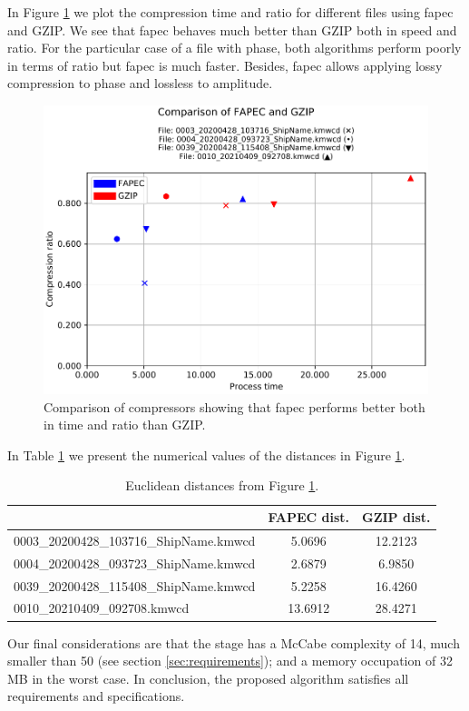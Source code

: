 In Figure \ref{fig:kmall_compare} we plot the compression time and ratio for different files using \acrshort{fapec} and GZIP. We see that \acrshort{fapec} behaves much better than GZIP both in speed and ratio. For the particular case of a file with phase, both algorithms perform poorly in terms of ratio but \acrshort{fapec} is much faster. Besides, \acrshort{fapec} allows applying lossy compression to phase and lossless to amplitude.

\begin{figure}[h!]
	\begin{center}
		\includegraphics[scale=0.69]{images/2021-05-31T23:59:08.498586-results_kmall.csv_comparison.pdf}
	\end{center}
	\caption{Comparison of compressors showing that \acrshort{fapec} performs better both in time and ratio than GZIP.}
	\label{fig:kmall_compare}
\end{figure}

In Table \ref{tab:kmall_compare} we present the numerical values of the distances in Figure \ref{fig:kmall_compare}.

\begin{table}[h!]
\normalsize
\centering
\begin{tabular}{|l|c|c|}
	\hline
	\rowcolor[HTML]{d6cefc} 
	\multicolumn{1}{|c|}{\cellcolor[HTML]{d6cefc}Filename}         & FAPEC dist. & GZIP dist. \\ \hline
	\cellcolor[HTML]{FFFFFF}0003\_20200428\_103716\_ShipName.kmwcd & 5.0696      & 12.2123    \\ \hline
	\cellcolor[HTML]{FFFFFF}0004\_20200428\_093723\_ShipName.kmwcd & 2.6879      & 6.9850     \\ \hline
	\cellcolor[HTML]{FFFFFF}0039\_20200428\_115408\_ShipName.kmwcd & 5.2258      & 16.4260    \\ \hline
	0010\_20210409\_092708.kmwcd                                   & 13.6912     & 28.4271    \\ \hline
\end{tabular}
\caption{Euclidean distances from Figure \ref{fig:kmall_compare}.}
\label{tab:kmall_compare}
\end{table}

Our final considerations are that the stage has a McCabe complexity of 14, much smaller than 50 (see section \ref{sec:requirements}); and a memory occupation of 32 MB in the worst case. In conclusion, the proposed algorithm satisfies all requirements and specifications.